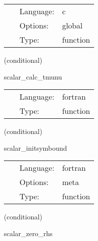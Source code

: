  \begin{tabular*}{160mm}{cll} 
~ & Language:  & c \\ 
~ & Options:  & global \\ 
~ & Type:  & function \\ 
\end{tabular*} 


\vspace{5mm}

   (conditional) 

\hspace{5mm} scalar\_calc\_tmunu 

\hspace{5mm}{\it compute the energy-momentum tensor } 


\hspace{5mm}

 \begin{tabular*}{160mm}{cll} 
~ & Language:  & fortran \\ 
~ & Type:  & function \\ 
\end{tabular*} 


\vspace{5mm}

   (conditional) 

\hspace{5mm} scalar\_initsymbound 

\hspace{5mm}{\it schedule symmetries } 


\hspace{5mm}

 \begin{tabular*}{160mm}{cll} 
~ & Language:  & fortran \\ 
~ & Options:  & meta \\ 
~ & Type:  & function \\ 
\end{tabular*} 


\vspace{5mm}

   (conditional) 

\hspace{5mm} scalar\_zero\_rhs 

\hspace{5mm}{\it set all rhs functions to zero to prevent spurious nans } 


\hspace{5mm}

